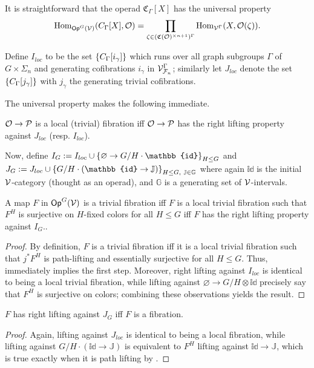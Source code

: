 \documentclass[psamsfonts,oneside,10pt,letterpaper
,draft
]{amsart}%
\renewcommand{\F}{\mathcal F}
\newcommand{\J}{\ensuremath{\mathbb{J}}}
\renewcommand{\1}{\ensuremath{\mathbb{id}}}
\renewcommand{\P}{\ensuremath{\mathcal{P}}}
\begin{document}
It is straightforward that the operad $\mathfrak C_\Gamma[X]$ has the universal property
\begin{equation}
      \operatorname{Hom}_{\mathsf{Op}^G(\mathcal V)}(C_\Gamma[X], \mathcal{O}) = \mathop\prod\limits_{\zeta \in (\mathfrak C(\mathcal{O})^{\times n+1})^\Gamma}\operatorname{Hom}_{\mathcal V^\Gamma}(X, \mathcal{O}(\zeta)).
\end{equation}

Define $I_{loc}$ to be the set $\left\{C_{\Gamma}[i_\gamma]\right\}$ which runs over all
graph subgroups $\Gamma$ of $G \times \Sigma_n$ and
generating cofibrations $i_\gamma$ in $\V^\Gamma_{\F_n}$;
similarly let $J_{loc}$ denote the set $\left\{C_{\Gamma}[j_\gamma]\right\}$
with $j_\gamma$ the generating trivial cofibrations.

The universal property makes the following immediate.
\begin{corollary}
      $\O\to \P$ is a local (trivial) fibration {\sc iff}
      $\O\to \P$ has the right lifting property against $J_{loc}$ (resp. $I_{loc}$).
\end{corollary}

Now, define $I_{G}:= I_{loc} \mathbin{\cup} \set{\varnothing \to G/H \cdot \1}_{H\leq G}$
and
$J_{G} := J_{loc} \mathbin{\cup} \set{G/H \cdot (\1 \to \J)}_{H\leq G,\ \J\in\mathbb{G}}$
where again $\1$ is the initial $\mathcal V$-category (thought as an operad), and $\mathbb{G}$ is a generating set of $\mathcal V$-intervals. 

\begin{lemma}
      \label{CAV_4.8}
      A map $F$ in $\mathsf{Op}^G(\mathcal V)$ is a trivial fibration {\sc iff} $F$ is a local trivial fibration such that $F^H$ is surjective on $H$-fixed colors for all $H\leq G$ {\sc iff} $F$ has the right lifting property against $I_{G}$.. 
\end{lemma}
\begin{proof}
      By definition, $F$ is a trivial fibration {\sc iff}
      it is a local trivial fibration such that $j^*F^H$ is path-lifting and essentially surjective for all $H\leq G$.
      Thus, \cite[4.8]{Cav14} immediately implies the first step.
      Moreover, right lifting against $I_{loc}$ is identical to being a local trivial fibration, while
      lifting against $\varnothing \to G/H\otimes \1$ precisely say that $F^H$ is surjective on colors;
      combining these observations yields the result.
\end{proof}

\begin{lemma}
      $F$ has right lifting against $J_{G}$ {\sc iff} $F$ is a fibration.
\end{lemma}
\begin{proof}
      Again, lifting against $J_{loc}$ is identical to being a local fibration, while lifting against $G/H \cdot (\1 \to \J)$
      is equivalent to $F^H$ lifting against $\1 \to \J$, which is true exactly when it is path lifting by \cite{Cav14}. 
\end{proof}
\end{document}
